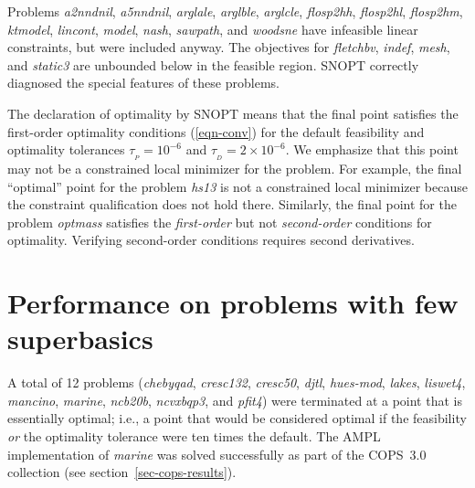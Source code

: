 \documentclass[draft,leqno,onefignum,onetabnum]{siamltex}
\def\D{_{\scriptscriptstyle D}}
\def\P{_{\scriptscriptstyle P}}
\def\AMPL  {{\small AMPL}}
\def\COPS  {{\small COPS}}
\def\SNOPT {{\small SNOPT}}
\def\Cute#1{\hbox{\it\lowercase{#1}\/}}
\begin{document}
Problems
\Cute{A2NNDNIL}, %
\Cute{A5NNDNIL}, %
\Cute{ARGLALE},  %
\Cute{ARGLBLE},  %
\Cute{ARGLCLE},  %
\Cute{FLOSP2HH}, %
\Cute{FLOSP2HL}, %
\Cute{FLOSP2HM}, %
\Cute{KTMODEL},  %
\Cute{LINCONT},  %
\Cute{MODEL},    %
\Cute{NASH},     %
\Cute{SAWPATH},  %
and
\Cute{WOODSNE}   %
have infeasible linear constraints, but were included anyway. The
objectives for \Cute{FLETCHBV}, \Cute{INDEF}, \Cute{MESH}, and
\Cute{STATIC3} are unbounded below in the feasible region. \SNOPT{}
correctly diagnosed the special features of these problems.

The declaration of optimality by \SNOPT{} means that the final point
satisfies the first-order optimality conditions (\ref{eqn-conv}) for
the default feasibility and optimality tolerances
$\tau_{\P} = 10^{-6}$ and $\tau_{\D} = 2\times 10^{-6}$.
We emphasize that this point may not be a
constrained local minimizer for the problem.  For example, the final
``optimal'' point for the problem \Cute{HS13} is not a constrained
local minimizer because the constraint qualification does not hold
there.  Similarly, the final point for the problem \Cute{OPTMASS}
satisfies the \emph{first-order} but not \emph{second-order}
conditions for optimality. Verifying  second-order conditions requires
second derivatives.

\section*{Performance on problems with few superbasics}
A total of  12 problems
(\Cute{CHEBYQAD},  %
\Cute{CRESC132},  %
\Cute{CRESC50},   %
\Cute{DJTL},      %
\Cute{HUES-MOD},  %
\Cute{LAKES},     %
\Cute{LISWET4},   %
\Cute{MANCINO},   %
\Cute{MARINE},    %
{\it ncb\-20b},    %
\Cute{NCVXBQP3},  %
and
\Cute{PFIT4})     %
were terminated at a point that is essentially optimal; i.e.,
a point that would be considered optimal if the
feasibility \emph{or} the optimality tolerance were ten
times the default.  The \AMPL{}
implementation of \Cute{MARINE} was solved successfully as part of the
\COPS~3.0 collection (see section~\ref{sec-cops-results}).
\end{document}
